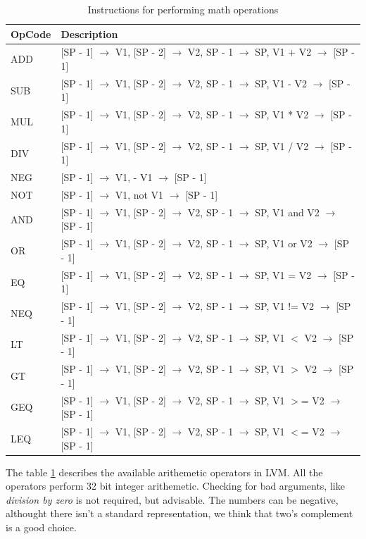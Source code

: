 \documentclass[a4paper, 11pt]{report}
\newcommand{\arrow}{\ensuremath{\rightarrow}}
\begin{document}
\begin{table}[htb]
 \begin{tabular}{|l|l|}
  \hline
  OpCode & Description\\
  \hline\hline
   ADD & [SP - 1] \arrow{} V1, [SP - 2] \arrow{} V2, SP - 1 \arrow{} SP, V1 + V2 \arrow{} [SP - 1]\\ 
   SUB & [SP - 1] \arrow{} V1, [SP - 2] \arrow{} V2, SP - 1 \arrow{} SP, V1 - V2 \arrow{} [SP - 1]\\  
   MUL & [SP - 1] \arrow{} V1, [SP - 2] \arrow{} V2, SP - 1 \arrow{} SP, V1 * V2 \arrow{} [SP - 1]\\  
   DIV & [SP - 1] \arrow{} V1, [SP - 2] \arrow{} V2, SP - 1 \arrow{} SP, V1 / V2 \arrow{} [SP - 1]\\  
   NEG & [SP - 1] \arrow{} V1, - V1 \arrow{} [SP - 1]\\  
   NOT & [SP - 1] \arrow{} V1,  not V1 \arrow{} [SP - 1]\\  
   AND & [SP - 1] \arrow{} V1, [SP - 2] \arrow{} V2, SP - 1 \arrow{} SP, V1 and V2 \arrow{} [SP - 1]\\  
   OR & [SP - 1] \arrow{} V1, [SP - 2] \arrow{} V2, SP - 1 \arrow{} SP, V1 or V2 \arrow{} [SP - 1]\\  
   EQ & [SP - 1] \arrow{} V1, [SP - 2] \arrow{} V2, SP - 1 \arrow{} SP, V1 = V2 \arrow{} [SP - 1]\\  
   NEQ & [SP - 1] \arrow{} V1, [SP - 2] \arrow{} V2, SP - 1 \arrow{} SP, V1 != V2 \arrow{} [SP - 1]\\  
   LT & [SP - 1] \arrow{} V1, [SP - 2] \arrow{} V2, SP - 1 \arrow{} SP, V1 $<$ V2 \arrow{} [SP - 1]\\  
   GT & [SP - 1] \arrow{} V1, [SP - 2] \arrow{} V2, SP - 1 \arrow{} SP, V1 $>$ V2 \arrow{} [SP - 1]\\  
   GEQ & [SP - 1] \arrow{} V1, [SP - 2] \arrow{} V2, SP - 1 \arrow{} SP, V1 $>$= V2 \arrow{} [SP - 1]\\  
   LEQ & [SP - 1] \arrow{} V1, [SP - 2] \arrow{} V2, SP - 1 \arrow{} SP, V1 $<$= V2 \arrow{} [SP - 1]\\  
 \hline
 \end{tabular}
 \caption{Instructions for performing math operations}
 \label{tbl:mathop}
\end{table}

The table \ref{tbl:mathop} describes the available arithemetic operators in LVM. All the
operators perform 32 bit integer arithemetic. Checking for bad arguments, like \emph{division
by zero} is not required, but advisable. The numbers can be negative, althought there isn't
a standard representation, we think that two's complement is a good choice.
\end{document}
